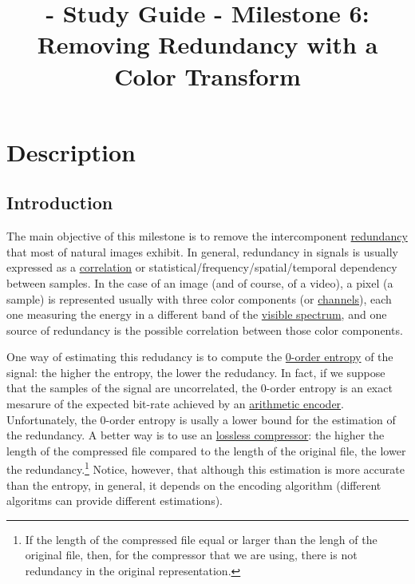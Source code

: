 
\title{\SM{} - Study Guide - Milestone 6: Removing Redundancy with a Color Transform}

\maketitle

\section{Description}

\subsection{Introduction}
The main objective of this milestone is to remove the intercomponent
\href{https://en.wikipedia.org/wiki/Data_redundancy}{redundancy} that
most of natural images exhibit. In general, redundancy in signals is
usually expressed as a
\href{https://en.wikipedia.org/wiki/Correlation_and_dependence}{correlation}
or statistical/frequency/spatial/temporal dependency between
samples. In the case of an image (and of course, of a video), a pixel
(a sample) is represented usually with three color components (or
\href{https://en.wikipedia.org/wiki/Color_image}{channels}), each one
measuring the energy in a different band of the
\href{https://en.wikipedia.org/wiki/Visible_spectrum}{visible
  spectrum}, and one source of redundancy is the possible correlation
between those color components.

One way of estimating this redudancy is to compute the
\href{https://en.wikipedia.org/wiki/Entropy_(information_theory)}{0-order
  entropy} of the signal: the higher the entropy, the lower the
redudancy. In fact, if we suppose that the samples of the signal are
uncorrelated, the 0-order entropy is an exact mesarure of the expected
bit-rate achieved by an
\href{https://en.wikipedia.org/wiki/Arithmetic_coding}{arithmetic
  encoder}. Unfortunately, the 0-order entropy is usally a lower bound
for the estimation of the redundancy. A better way is to use an
\href{https://en.wikipedia.org/wiki/Data_compression}{lossless
  compressor}: the higher the length of the compressed file compared
to the length of the original file, the lower the
redundancy.\footnote{If the length of the compressed file equal or
  larger than the lengh of the original file, then, for the compressor
  that we are using, there is not redundancy in the original
  representation.} Notice, however, that although this estimation is
more accurate than the entropy, in general, it depends on the encoding
algorithm (different algoritms can provide different estimations).

